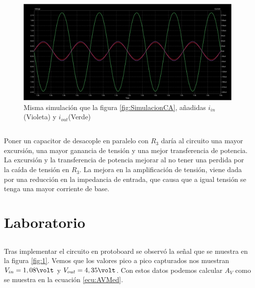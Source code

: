 \documentclass[12pt,letterpaper]{article}     %
\begin{document}
{\begin{figure}[!ht]
\centering
\includegraphics[scale=0.3]{imagenes/SimulacionCACorrientes.png}
\caption{Misma simulación que la figura \ref{fig:SimulacionCA}, añadidas $i_{in}$(Violeta) y $i_{out}$(Verde)}
\label{fig:SimulacionCACorrientes}
\end{figure}

\subsection{}

Poner un capacitor de desacople en paralelo con $R_3$ daría al circuito una mayor excursión, 
una mayor ganancia de tensión y una mejor transferencia de potencia. La excursión y la 
transferencia de potencia mejorar al no tener una perdida por la caída de tensión en $R_3$.
La mejora en la amplificación de tensión, viene dada por una reducción en la impedancia de
entrada, que causa que a igual tensión se tenga una mayor corriente de base.

\newpage
\section{Laboratorio}
\subsection{}

Tras implementar el circuito en protoboard se observó la señal que se muestra en la figura \ref{fig:1}.
Vemos que los valores pico a pico capturados nos muestran $V_{in} = 1,08\volt$ y $V_{out} = 4,35\volt$.
Con estos datos podemos calcular $A_V$ como se muestra en la ecuación \ref{ecu:AVMed}.

}
\end{document}

